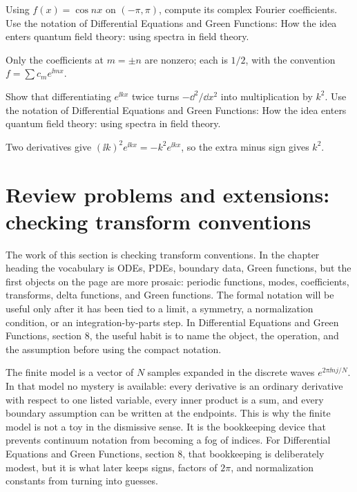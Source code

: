\begin{exercise}
Using \(f(x)=\cos nx\) on \((-\pi,\pi)\), compute its complex Fourier coefficients.  Use the notation of Differential Equations and Green Functions: How the idea enters quantum field theory: using spectra in field theory.
\begin{answer}
Only the coefficients at \(m=\pm n\) are nonzero; each is \(1/2\), with the convention \(f=\sum c_me^{\ii mx}\).
\end{answer}
\end{exercise}

\begin{exercise}
Show that differentiating \(e^{\ii kx}\) twice turns \(-\dd^2/\dd x^2\) into multiplication by \(k^2\).  Use the notation of Differential Equations and Green Functions: How the idea enters quantum field theory: using spectra in field theory.
\begin{answer}
Two derivatives give \((\ii k)^2e^{\ii kx}=-k^2e^{\ii kx}\), so the extra minus sign gives \(k^2\).
\end{answer}
\end{exercise}



\section{Review problems and extensions: checking transform conventions}

The work of this section is checking transform conventions.  In the chapter heading the vocabulary is ODEs, PDEs, boundary data, Green functions, but the first objects on the page are more prosaic: periodic functions, modes, coefficients, transforms, delta functions, and Green functions.  The formal notation will be useful only after it has been tied to a limit, a symmetry, a normalization condition, or an integration-by-parts step.  In Differential Equations and Green Functions, section 8, the useful habit is to name the object, the operation, and the assumption before using the compact notation.

The finite model is a vector of \(N\) samples expanded in the discrete waves \(e^{2\pi \ii nj/N}\).  In that model no mystery is available: every derivative is an ordinary derivative with respect to one listed variable, every inner product is a sum, and every boundary assumption can be written at the endpoints.  This is why the finite model is not a toy in the dismissive sense.  It is the bookkeeping device that prevents continuum notation from becoming a fog of indices.  For Differential Equations and Green Functions, section 8, that bookkeeping is deliberately modest, but it is what later keeps signs, factors of \(2\pi\), and normalization constants from turning into guesses.

